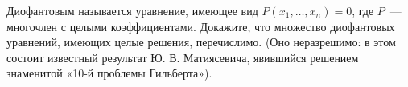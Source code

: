 Диофантовым называется уравнение, имеющее вид $P(x_1, \dots, x_n) = 0$, где $P$~--- многочлен с целыми
коэффициентами. Докажите, что множество диофантовых уравнений, имеющих целые решения, перечислимо. (Оно неразрешимо: в этом
состоит известный результат Ю. В. Матиясевича, явившийся решением знаменитой «10-й проблемы Гильберта»).